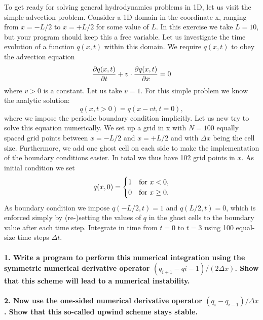 To get ready for solving general hydrodynamics problems 
in 1D, let us visit the simple advection problem. Consider 
a 1D domain in the coordinate x, ranging from $x=-L/2$ to 
$x=+L/2$ for some value of $L$. 
In this exercise we take $L=10$, but your program should 
keep this a free variable. Let us investigate the time 
evolution of a function $q(x, t)$ within this domain. We 
require $q(x, t)$ to obey the advection equation
\begin{equation}
    \frac{\partial q(x,t)}{\partial t}+v\cdot\frac{\partial q(x,t)}{\partial x}=0
\end{equation}
where $v>0$ is a constant. Let us take $v=1$. For this 
simple problem we know the analytic solution: 
\begin{equation}
    q(x, t>0) = q(x-vt, t=0),
\end{equation}
where we impose the periodic boundary condition implicitly. 
Let us new try to solve this equation numerically. We set 
up a grid in x with $N=100$ equally spaced grid points 
between $x=-L/2$ and $x=+L/2$ and with $\Delta x$ being the 
cell size. Furthermore, we add one ghost cell on each side 
to make the implementation of the boundary conditions 
easier.  In total we thus have 102 grid points in $x$. 
As initial condition we set
\begin{equation}
    q(x,0)=
    \begin{cases}
        1 &  \textnormal{for }x<0, \\
        0 &  \textnormal{for }x\geq0.
    \end{cases}
\end{equation}
As boundary condition we impose $q(-L/2, t)=1$ and 
$q(L/2,t)=0$, which is enforced simply by (re-)setting the 
values of $q$ in the ghost cells to the boundary value 
after each time step. Integrate in time from $t=0$ to 
$t=3$ using 100 equal-size time steps $\Delta t$.

\paragraph{1. Write a program to perform this numerical 
    integration using the symmetric numerical derivative 
    operator $(q_{i+1}-q{i-1})/(2\Delta x)$. Show that this 
    scheme will lead to a numerical instability.
}

\paragraph{2. Now use the one-sided numerical derivative 
    operator $(q_i-q_{i-1})/\Delta x$. Show that this 
    so-called upwind scheme stays stable.
}

